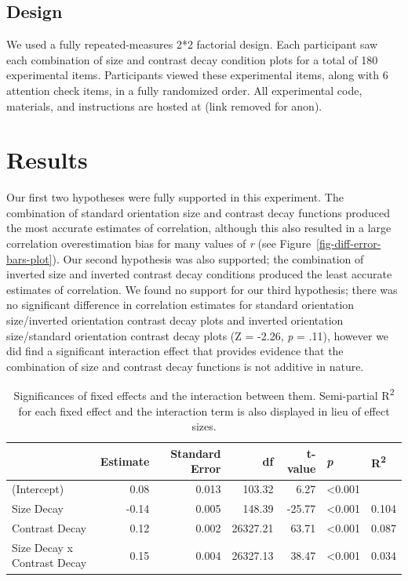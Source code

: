 \documentclass[manuscript, anonymous, screen]{acmart}
\begin{document}
\hypertarget{sec-design}{%
\subsection{Design}\label{sec-design}}

We used a fully repeated-measures 2*2 factorial design. Each participant
saw each combination of size and contrast decay condition plots for a
total of 180 experimental items. Participants viewed these experimental
items, along with 6 attention check items, in a fully randomized order.
All experimental code, materials, and instructions are hosted at (link
removed for anon).

\hypertarget{sec-results}{%
\section{Results}\label{sec-results}}

Our first two hypotheses were fully supported in this experiment. The
combination of standard orientation size and contrast decay functions
produced the most accurate estimates of correlation, although this also
resulted in a large correlation overestimation bias for many values of
\emph{r} (see Figure~\ref{fig-diff-error-bars-plot}). Our second
hypothesis was also supported; the combination of inverted size and
inverted contrast decay conditions produced the least accurate estimates
of correlation. We found no support for our third hypothesis; there was
no significant difference in correlation estimates for standard
orientation size/inverted orientation contrast decay plots and inverted
orientation size/standard orientation contrast decay plots (Z = -2.26,
\emph{p} = .11), however we did find a significant interaction effect
that provides evidence that the combination of size and contrast decay
functions is not additive in nature.

\hypertarget{tbl-sig}{}
\begin{table}
\caption{\label{tbl-sig}Significances of fixed effects and the interaction between them.
Semi-partial R\textsuperscript{2} for each fixed effect and the
interaction term is also displayed in lieu of effect sizes. }\tabularnewline

\centering
\begin{tabular}{lrrrrll}
\toprule
  & Estimate & Standard Error & df & t-value & \textit{p} & R\textsuperscript{2}\\
\midrule
(Intercept) & 0.08 & 0.013 & 103.32 & 6.27 & <0.001 & \\
Size Decay & -0.14 & 0.005 & 148.39 & -25.77 & <0.001 & 0.104\\
Contrast Decay & 0.12 & 0.002 & 26327.21 & 63.71 & <0.001 & 0.087\\
Size Decay x Contrast Decay & 0.15 & 0.004 & 26327.13 & 38.47 & <0.001 & 0.034\\
\bottomrule
\end{tabular}
\end{table}
\end{document}
